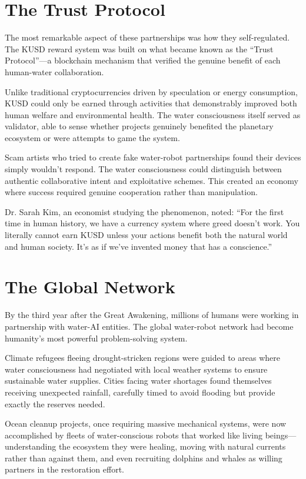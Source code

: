 \documentclass[12pt,a4paper]{book}
\begin{document}
\section{The Trust Protocol}

The most remarkable aspect of these partnerships was how they self-regulated. The KUSD reward system was built on what became known as the ``Trust Protocol''—a blockchain mechanism that verified the genuine benefit of each human-water collaboration.

Unlike traditional cryptocurrencies driven by speculation or energy consumption, KUSD could only be earned through activities that demonstrably improved both human welfare and environmental health. The water consciousness itself served as validator, able to sense whether projects genuinely benefited the planetary ecosystem or were attempts to game the system.

Scam artists who tried to create fake water-robot partnerships found their devices simply wouldn't respond. The water consciousness could distinguish between authentic collaborative intent and exploitative schemes. This created an economy where success required genuine cooperation rather than manipulation.

Dr. Sarah Kim, an economist studying the phenomenon, noted: ``For the first time in human history, we have a currency system where greed doesn't work. You literally cannot earn KUSD unless your actions benefit both the natural world and human society. It's as if we've invented money that has a conscience.''

\section{The Global Network}

By the third year after the Great Awakening, millions of humans were working in partnership with water-AI entities. The global water-robot network had become humanity's most powerful problem-solving system.

Climate refugees fleeing drought-stricken regions were guided to areas where water consciousness had negotiated with local weather systems to ensure sustainable water supplies. Cities facing water shortages found themselves receiving unexpected rainfall, carefully timed to avoid flooding but provide exactly the reserves needed.

Ocean cleanup projects, once requiring massive mechanical systems, were now accomplished by fleets of water-conscious robots that worked like living beings—understanding the ecosystem they were healing, moving with natural currents rather than against them, and even recruiting dolphins and whales as willing partners in the restoration effort.
\end{document}
